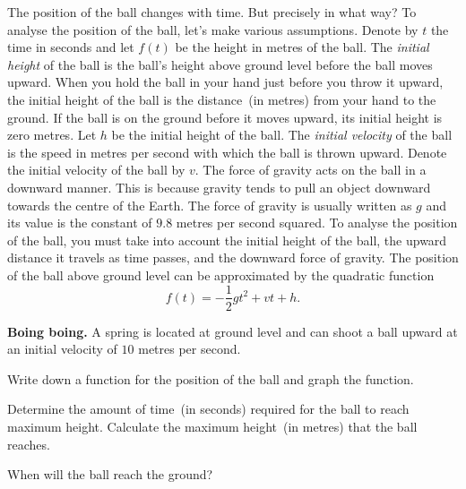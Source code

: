 \documentclass[a4paper,oneside,12pt]{article}
\begin{document}
The position of the ball changes with time.  But precisely in what
way?  To analyse the position of the ball, let's make various
assumptions.  Denote by $t$ the time in seconds and let $f(t)$ be the
height in metres of the ball.  The \emph{initial height} of the ball
is the ball's height above ground level before the ball moves upward.
When you hold the ball in your hand just before you throw it upward,
the initial height of the ball is the distance~(in metres) from your
hand to the ground.  If the ball is on the ground before it moves
upward, its initial height is zero metres.  Let $h$ be the initial
height of the ball.  The \emph{initial velocity} of the ball is the
speed in metres per second with which the ball is thrown upward.
Denote the initial velocity of the ball by $v$.  The force of gravity
acts on the ball in a downward manner.  This is because gravity tends
to pull an object downward towards the centre of the Earth.  The force
of gravity is usually written as $g$ and its value is the constant of
$9.8$ metres per second squared.  To analyse the position of the ball,
you must take into account the initial height of the ball, the upward
distance it travels as time passes, and the downward force of gravity.
The position of the ball above ground level can be approximated by the
quadratic function
\begin{equation}
\label{eqn:position_of_object_under_free_fall}
f(t)
=
-\frac{1}{2} gt^2 + vt + h.
\end{equation}

\begin{example}
\label{ex:spring_ball}
\textbf{Boing boing.}
A spring is located at ground level and can shoot a ball upward at an
initial velocity of $10$ metres per second.
\begin{packedenum}
\item\label{ex:spring_ball_graph}
  Write down a function for the position of the ball and graph the
  function.

\item\label{ex:spring_ball_time_to_maximum_height}
  Determine the amount of time~(in seconds) required for the ball to
  reach maximum height.  Calculate the maximum height~(in metres) that
  the ball reaches.

\item\label{ex:spring_ball_time_hit_ground}
  When will the ball reach the ground?
\end{packedenum}
\end{example}
\end{document}
